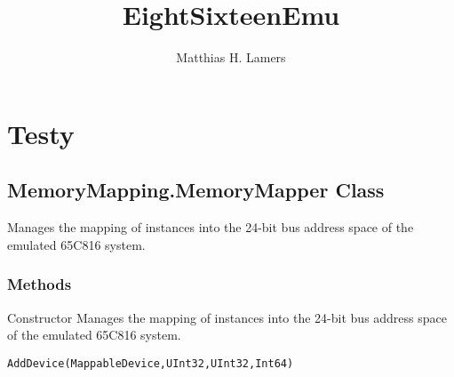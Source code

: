 \documentclass{memoir}
\title{EightSixteenEmu}
\author{Matthias H. Lamers}
\begin{document}
	
	\chapter{Testy}
	\section{MemoryMapping.MemoryMapper Class}
	Manages the mapping of instances into the 24-bit bus address space of the emulated 65C816 system.
	\subsection{Methods}
	\begin{blockdescription}
		\item[Constructor] Manages the mapping of instances into the 24-bit bus address space of the emulated 65C816 system.
		\item[\texttt{AddDevice(MappableDevice,UInt32,UInt32,Int64)}]
	\end{blockdescription}
	
\end{document}
